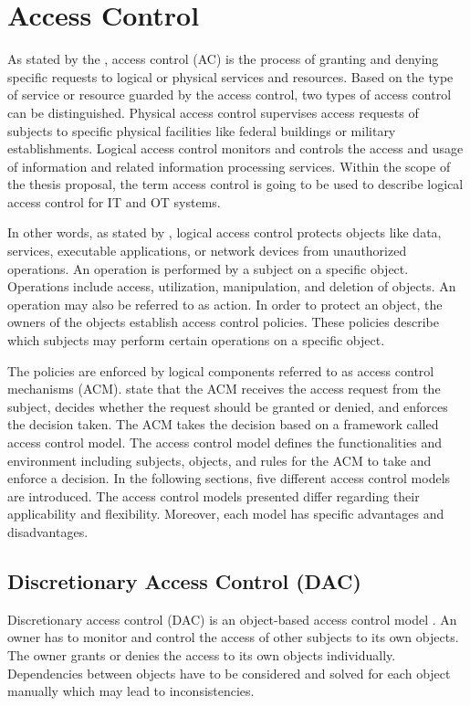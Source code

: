 \section{Access Control}
\label{sec:accesscontrol}
As stated by the \citeauthor{NIST2022} \cite{NIST2022}, access control (AC) is the process of granting and denying specific requests to logical or physical services and resources.
Based on the type of service or resource guarded by the access control, two types of access control can be distinguished.
Physical access control supervises access requests of subjects to specific physical facilities like federal buildings or military establishments.
Logical access control monitors and controls the access and usage of information and related information processing services.
Within the scope of the thesis proposal, the term access control is going to be used to describe logical access control for IT and OT systems.

In other words, as stated by \citeauthor{Hu2014} \cite{Hu2014}, logical access control protects objects like data, services, executable applications, or network devices from unauthorized operations.
An operation is performed by a subject on a specific object.
Operations include access, utilization, manipulation, and deletion of objects.
An operation may also be referred to as action.
In order to protect an object, the owners of the objects establish access control policies.
These policies describe which subjects may perform certain operations on a specific object.

The policies are enforced by logical components referred to as access control mechanisms (ACM).
\citeauthor{Hu2014} state that the ACM receives the access request from the subject, decides whether the request should be granted or denied, and enforces the decision taken.
The ACM takes the decision based on a framework called access control model.
The access control model defines the functionalities and environment including subjects, objects, and rules for the ACM to take and enforce a decision.
In the following sections, five different access control models are introduced.
The access control models presented differ regarding their applicability and flexibility.
Moreover, each model has specific advantages and disadvantages.

\subsection{Discretionary Access Control (DAC)}
Discretionary access control (DAC) is an object-based access control model \cite{Eckert2023}.
An owner has to monitor and control the access of other subjects to its own objects.
The owner grants or denies the access to its own objects individually.
Dependencies between objects have to be considered and solved for each object manually which may lead to inconsistencies.

